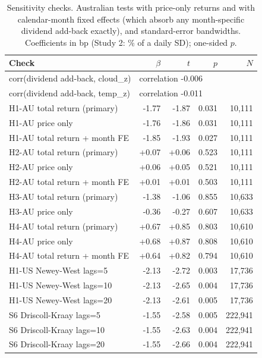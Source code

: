 \begin{table}[htbp]\centering\footnotesize
\caption{Sensitivity checks. Australian tests with price-only returns and with calendar-month fixed effects (which absorb any month-specific dividend add-back exactly), and standard-error bandwidths. Coefficients in bp (Study 2: \% of a daily SD); one-sided $p$.}
\label{tab:checks}
\begin{tabular}{lrrrr}\toprule
Check & $\beta$ & $t$ & $p$ & $N$ \\ \midrule
corr(dividend add-back, cloud\_z) & \multicolumn{4}{l}{correlation -0.006} \\
corr(dividend add-back, temp\_z) & \multicolumn{4}{l}{correlation -0.011} \\
H1-AU total return (primary) & -1.77 & -1.87 & 0.031 & 10,111 \\
H1-AU price only & -1.76 & -1.86 & 0.031 & 10,111 \\
H1-AU total return + month FE & -1.85 & -1.93 & 0.027 & 10,111 \\
H2-AU total return (primary) & +0.07 & +0.06 & 0.523 & 10,111 \\
H2-AU price only & +0.06 & +0.05 & 0.521 & 10,111 \\
H2-AU total return + month FE & +0.01 & +0.01 & 0.503 & 10,111 \\
H3-AU total return (primary) & -1.38 & -1.06 & 0.855 & 10,633 \\
H3-AU price only & -0.36 & -0.27 & 0.607 & 10,633 \\
H4-AU total return (primary) & +0.67 & +0.85 & 0.803 & 10,610 \\
H4-AU price only & +0.68 & +0.87 & 0.808 & 10,610 \\
H4-AU total return + month FE & +0.64 & +0.82 & 0.794 & 10,610 \\
H1-US Newey-West lags=5 & -2.13 & -2.72 & 0.003 & 17,736 \\
H1-US Newey-West lags=10 & -2.13 & -2.65 & 0.004 & 17,736 \\
H1-US Newey-West lags=20 & -2.13 & -2.61 & 0.005 & 17,736 \\
S6 Driscoll-Kraay lags=5 & -1.55 & -2.58 & 0.005 & 222,941 \\
S6 Driscoll-Kraay lags=10 & -1.55 & -2.63 & 0.004 & 222,941 \\
S6 Driscoll-Kraay lags=20 & -1.55 & -2.66 & 0.004 & 222,941 \\
\bottomrule\end{tabular}\end{table}
